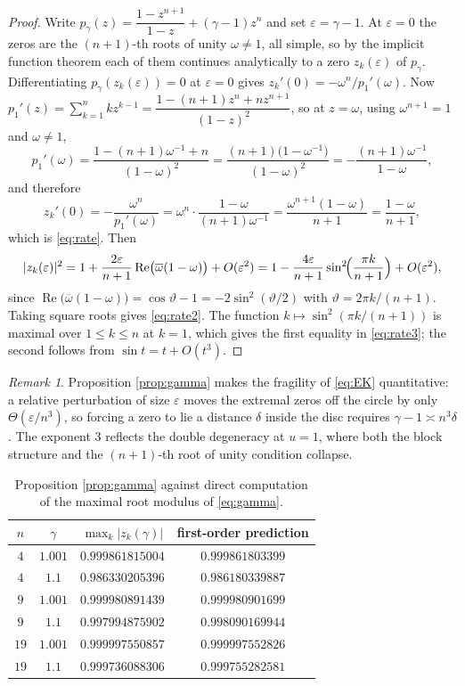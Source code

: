 \documentclass[11pt]{amsart}
\theoremstyle{plain}
\theoremstyle{definition}
\theoremstyle{remark}
\newtheorem{remark}[theorem]{Remark}
\newcommand{\abs}[1]{\lvert #1\rvert}
\begin{document}
\begin{proof}
Write $p_\gamma(z)=\dfrac{1-z^{n+1}}{1-z}+(\gamma-1)z^{n}$ and set $\varepsilon=\gamma-1$.
At $\varepsilon=0$ the zeros are the $(n+1)$-th roots of unity $\omega\ne1$, all simple, so
by the implicit function theorem each of them continues analytically to a zero
$z_k(\varepsilon)$ of $p_\gamma$. Differentiating $p_\gamma(z_k(\varepsilon))=0$ at
$\varepsilon=0$ gives $z_k'(0)=-\omega^{n}/p_1'(\omega)$. Now
$p_1'(z)=\sum_{k=1}^{n}kz^{k-1}=\dfrac{1-(n+1)z^{n}+nz^{n+1}}{(1-z)^{2}}$, so at
$z=\omega$, using $\omega^{n+1}=1$ and $\omega\ne1$,
\[
p_1'(\omega)=\frac{1-(n+1)\omega^{-1}+n}{(1-\omega)^{2}}
=\frac{(n+1)\bigl(1-\omega^{-1}\bigr)}{(1-\omega)^{2}}
=-\frac{(n+1)\omega^{-1}}{1-\omega},
\]
and therefore
\[
z_k'(0)=-\frac{\omega^{n}}{p_1'(\omega)}
=\omega^{n}\cdot\frac{1-\omega}{(n+1)\omega^{-1}}
=\frac{\omega^{n+1}(1-\omega)}{n+1}
=\frac{1-\omega}{n+1},
\]
which is \eqref{eq:rate}. Then
\[
\abs{z_k(\varepsilon)}^{2}
=1+\frac{2\varepsilon}{n+1}\operatorname{Re}\bigl(\overline{\omega}(1-\omega)\bigr)
+O(\varepsilon^{2})
=1-\frac{4\varepsilon}{n+1}\sin^{2}\!\Bigl(\frac{\pi k}{n+1}\Bigr)+O(\varepsilon^{2}),
\]
since $\operatorname{Re}\bigl(\overline{\omega}(1-\omega)\bigr)=\cos\vartheta-1
=-2\sin^{2}(\vartheta/2)$ with $\vartheta=2\pi k/(n+1)$. Taking square roots gives
\eqref{eq:rate2}. The function $k\mapsto\sin^{2}(\pi k/(n+1))$ is maximal over
$1\le k\le n$ at $k=1$, which gives the first equality in \eqref{eq:rate3}; the second
follows from $\sin t=t+O(t^{3})$.
\end{proof}

\begin{remark}
Proposition \ref{prop:gamma} makes the fragility of \eqref{eq:EK} quantitative: a relative
perturbation of size $\varepsilon$ moves the extremal zeros off the circle by only
$\Theta(\varepsilon/n^{3})$, so forcing a zero to lie a distance $\delta$ inside the disc
requires $\gamma-1\asymp n^{3}\delta$. The exponent $3$ reflects the double degeneracy at
$u=1$, where both the block structure and the $(n+1)$-th root of unity condition collapse.
\end{remark}

\begin{table}[ht]
\centering
\caption{Proposition \ref{prop:gamma} against direct computation of the maximal root modulus
of \eqref{eq:gamma}.}
\label{tab:gamma}
\begin{tabular}{cccc}
\toprule
$n$ & $\gamma$ & $\max_k\abs{z_k(\gamma)}$ & first-order prediction \\
\midrule
$4$  & $1.001$ & $0.999861815004$ & $0.999861803399$ \\
$4$  & $1.1$   & $0.986330205396$ & $0.986180339887$ \\
$9$  & $1.001$ & $0.999980891439$ & $0.999980901699$ \\
$9$  & $1.1$   & $0.997994875902$ & $0.998090169944$ \\
$19$ & $1.001$ & $0.999997550857$ & $0.999997552826$ \\
$19$ & $1.1$   & $0.999736088306$ & $0.999755282581$ \\
\bottomrule
\end{tabular}
\end{table}
\end{document}
